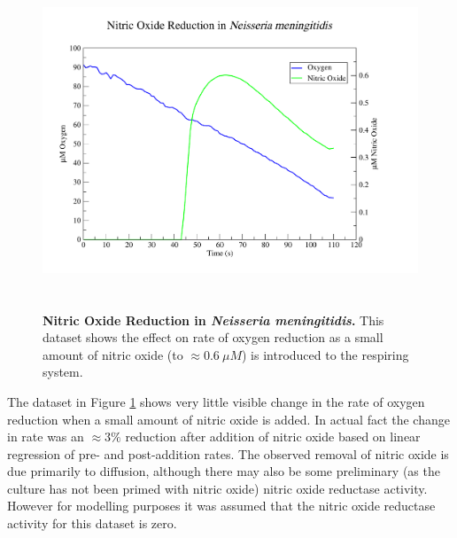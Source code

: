 \begin{figure}[tbp]
 \centering
 \includegraphics[height=10cm, trim=2cm 1cm 4cm 1cm]{./06-noreduction/data/aer-no-data1.pdf}
 \caption[{Nitric Oxide Reduction in \textit{Neisseria meningitidis}.}]{{\bf Nitric Oxide Reduction in \textit{Neisseria meningitidis}.} This dataset shows the effect on rate of oxygen reduction as a small amount of nitric oxide (to $\approx 0.6~\mu M$) is introduced to the respiring system.}
 \label{fig:nodata1}
\end{figure}
The dataset in Figure \ref{fig:nodata1} shows very little visible change in the rate of oxygen reduction when a small amount of nitric oxide is added. In actual fact the change in rate was an $\approx 3\%$ reduction after addition of nitric oxide based on linear regression of pre- and post-addition rates. The observed removal of nitric oxide is due primarily to diffusion, although there may also be some preliminary (as the culture has not been primed with nitric oxide) nitric oxide reductase activity. However for modelling purposes it was assumed that the nitric oxide reductase activity for this dataset is zero.

